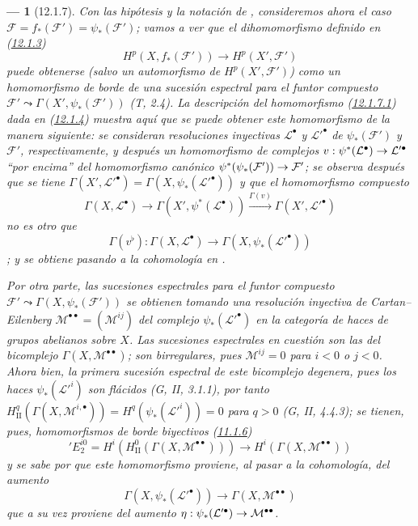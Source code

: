 \documentclass[10pt,oneside,openany]{book}
\theoremstyle{egaenv}\newtheorem*{env}{---}
\theoremstyle{egastatement}
\theoremstyle{egadescription}
\newcommand{\oldpage}[2][]{\marginnote{\normalfont\scriptsize\textbf{#1}\,|\,#2}\ignorespaces}
\renewcommand{\to}{\mathchoice{\longrightarrow}{\rightarrow}{\rightarrow}{\rightarrow}}
\begin{document}
\begin{env}[12.1.7]
\label{0.12.1.7}
\label{0.12.1.7-fr}
Con las hipótesis y la notación de , consideremos ahora el
caso
$\mathcal F=f_*(\mathcal F')=\psi_*(\mathcal F')$; vamos a ver que el dihomomorfismo definido en (\hyperref[0.12.1.3-fr]{12.1.3}) \[
\label{0.12.1.7.1-fr}
\tag{12.1.7.1}
H^p(X,f_*(\mathcal F'))\longrightarrow H^p(X',\mathcal F')
\]
puede obtenerse (salvo un automorfismo de $H^p(X',\mathcal F')$) como un
homomorfismo de borde de una sucesión espectral para el funtor compuesto
$\mathcal F'\leadsto\Gamma(X',\psi_*(\mathcal F'))$ (T, 2.4). La descripción del homomorfismo (\hyperref[0.12.1.7.1-fr]{12.1.7.1}) dada en (\hyperref[0.12.1.4-fr]{12.1.4}) muestra aquí que se puede obtener este homomorfismo de la manera siguiente: se consideran resoluciones inyectivas $\mathcal L^\bullet$ y
$\mathcal L'^\bullet$ de $\psi_*(\mathcal F')$ y $\mathcal F'$,
respectivamente, y después un homomorfismo de complejos
$v:\psi^*(\mathcal L^\bullet)\to\mathcal L'^\bullet$
``por encima'' del homomorfismo canónico
$\psi^*(\psi_*(\mathcal F'))\to\mathcal F'$;
\oldpage[0\textsubscript{III}]{56}
se observa después que se tiene $\Gamma(X',\mathcal L'^\bullet)=\Gamma(X,\psi_*(\mathcal L'^\bullet))$
y que el homomorfismo compuesto
\[
\Gamma(X,\mathcal L^\bullet)\longrightarrow
\Gamma(X',\psi^*(\mathcal L^\bullet))
\xrightarrow{\Gamma(v)}\Gamma(X',\mathcal L'^\bullet)
\]
no es otro que
\[
\label{0.12.1.7.2-fr}
\tag{12.1.7.2}
\Gamma(v^\flat):\Gamma(X,\mathcal L^\bullet)
\longrightarrow\Gamma(X,\psi_*(\mathcal L'^\bullet))
\]
; y  se
obtiene pasando a la cohomología en .

Por otra parte, las sucesiones espectrales para el funtor compuesto
$\mathcal F'\leadsto\Gamma(X,\psi_*(\mathcal F'))$
se obtienen tomando una resolución inyectiva de Cartan--Eilenberg
$\mathcal M^{\bullet\bullet}=(\mathcal M^{ij})$
del complejo $\psi_*(\mathcal L'^\bullet)$ en la categoría de
haces de grupos abelianos sobre $X$.
Las sucesiones espectrales en cuestión son las del bicomplejo
$\Gamma(X,\mathcal M^{\bullet\bullet})$; son birregulares, pues
$\mathcal M^{ij}=0$ para $i<0$ o $j<0$.
Ahora bien, la primera sucesión espectral de este bicomplejo degenera, pues
los haces $\psi_*(\mathcal L'^i)$ son flácidos (G, II, 3.1.1), por tanto $H_{\mathrm{II}}^q(\Gamma(X,\mathcal M^{i,\bullet}))
=H^q(\psi_*(\mathcal L'^i))=0$ para $q>0$ (G, II, 4.4.3); se tienen, pues, homomorfismos de borde \emph{biyectivos} (\hyperref[0.11.1.6-fr]{11.1.6})
\[
\label{0.12.1.7.3-fr}
\tag{12.1.7.3}
'E_2^{i0}=H^i(H_{\mathrm{II}}^0(\Gamma(X,\mathcal M^{\bullet\bullet})))
\longrightarrow H^i(\Gamma(X,\mathcal M^{\bullet\bullet}))
\]
y se sabe por  que este homomorfismo proviene, al pasar
a la cohomología, del aumento
\[
\label{0.12.1.7.4-fr}
\tag{12.1.7.4}
\Gamma(X,\psi_*(\mathcal L'^\bullet))
\longrightarrow\Gamma(X,\mathcal M^{\bullet\bullet})
\]
que a su vez proviene del aumento
$\eta:\psi_*(\mathcal L'^\bullet)\to\mathcal M^{\bullet\bullet}$.


\end{env}
\end{document}
